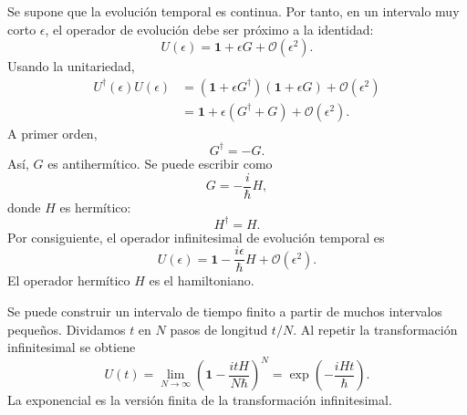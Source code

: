 Se supone que la evolución temporal es continua. Por tanto, en un intervalo muy corto \(\epsilon\), el operador de evolución debe ser próximo a la identidad:
\begin{equation}
U(\epsilon)=\mathbf 1+\epsilon G+\mathcal O(\epsilon^2).
\end{equation}
Usando la unitariedad,
\begin{align}
U^\dagger(\epsilon)U(\epsilon)
&=
\left(\mathbf 1+\epsilon G^\dagger\right)
\left(\mathbf 1+\epsilon G\right)
+\mathcal O(\epsilon^2)
\\
&=
\mathbf 1+\epsilon(G^\dagger+G)
+\mathcal O(\epsilon^2).
\end{align}
A primer orden,
\begin{equation}
G^\dagger=-G.
\end{equation}
Así, \(G\) es antihermítico. Se puede escribir como
\begin{equation}
G=-\frac{i}{\hbar}H,
\end{equation}
donde \(H\) es hermítico:
\begin{equation}
H^\dagger=H.
\end{equation}
Por consiguiente, el operador infinitesimal de evolución temporal es
\begin{equation}
U(\epsilon)
=
\mathbf 1-\frac{i\epsilon}{\hbar}H
+\mathcal O(\epsilon^2).
\end{equation}
El operador hermítico \(H\) es el hamiltoniano.

\begin{classroomqa}
\end{classroomqa}

Se puede construir un intervalo de tiempo finito a partir de muchos intervalos pequeños. Dividamos \(t\) en \(N\) pasos de longitud \(t/N\). Al repetir la transformación infinitesimal se obtiene
\begin{equation}
U(t)
=
\lim_{N\to\infty}
\left(
\mathbf 1-\frac{itH}{N\hbar}
\right)^N
=
\exp\left(-\frac{iHt}{\hbar}\right).
\end{equation}
La exponencial es la versión finita de la transformación infinitesimal.

